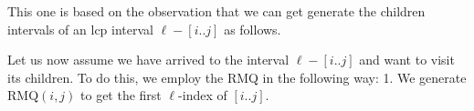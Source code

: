This one is based on the observation that we can get generate the children intervals of an lcp interval $\ell-[i..j]$ as follows.

Let us now assume we have arrived to the interval $\ell-[i..j]$ and want to visit its children. To do this, we employ the RMQ in the following way: 1. We generate $\text{RMQ}(i,j)$ to get the first $\ell$-index of $[i..j]$.

\begin{Shaded}
\begin{Highlighting}[]
\OperatorTok{=}
\OperatorTok{\textless{}}
\OperatorTok{=}
\end{Highlighting}
\end{Shaded}